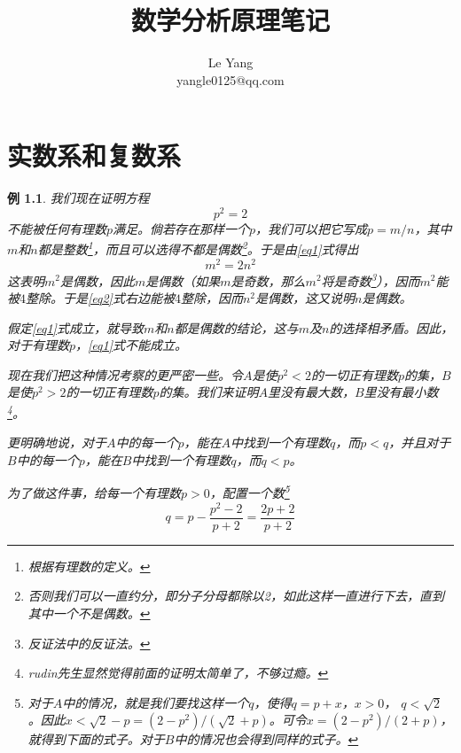 \documentclass[UTF8]{ctexbook}
\newtheorem{example}{例}[chapter]
\begin{document}
\title{数学分析原理笔记}
\author{
Le Yang\\
yangle0125@qq.com
}
\date{}
\maketitle

\tableofcontents

\chapter{实数系和复数系}

\begin{example}
我们现在证明方程
\begin{equation}
p^2 = 2	\label{eq1}
\end{equation}
不能被任何有理数$p$满足。倘若存在那样一个$p$，我们可以把它写成$p = m / n$，其中$m$和$n$都是整数\footnote{根据有理数的定义。}，而且可以选得不都是偶数\footnote{否则我们可以一直约分，即分子分母都除以2，如此这样一直进行下去，直到其中一个不是偶数。}。于是由\eqref{eq1}式得出
\begin{equation}
m^2 = 2n^2 \label{eq2}
\end{equation}
这表明$m^2$是偶数，因此$m$是偶数（如果$m$是奇数，那么$m^2$将是奇数\footnote{反证法中的反证法。}），因而$m^2$能被$4$整除。于是\eqref{eq2}式右边能被$4$整除，因而$n^2$是偶数，这又说明$n$是偶数。

假定\eqref{eq1}式成立，就导致$m$和$n$都是偶数的结论，这与$m$及$n$的选择相矛盾。因此，对于有理数$p$，\eqref{eq1}式不能成立。

现在我们把这种情况考察的更严密一些。令$A$是使$p^2 < 2$的一切正有理数$p$的集，$B$是使$p^2 > 2$的一切正有理数$p$的集。我们来证明$A$里没有最大数，$B$里没有最小数\footnote{rudin先生显然觉得前面的证明太简单了，不够过瘾。}。

更明确地说，对于$A$中的每一个$p$，能在$A$中找到一个有理数$q$，而$p < q$，并且对于$B$中的每一个$p$，能在$B$中找到一个有理数$q$，而$q < p$。

为了做这件事，给每一个有理数$p > 0$，配置一个数\footnote{对于$A$中的情况，就是我们要找这样一个$q$，使得$q = p + x$，$x > 0$， $q < \sqrt{2}$。因此$x < \sqrt{2} - p = (2 - p^2) / (\sqrt{2} + p)$。可令$x = (2 - p^2) / (2 + p)$，就得到下面的式子。对于$B$中的情况也会得到同样的式子。}
\begin{equation}
q = p - \frac{p^2 - 2}{p + 2} = \frac{2p + 2}{p + 2}\label{eq3}
\end{equation}

\end{example}
\end{document}
